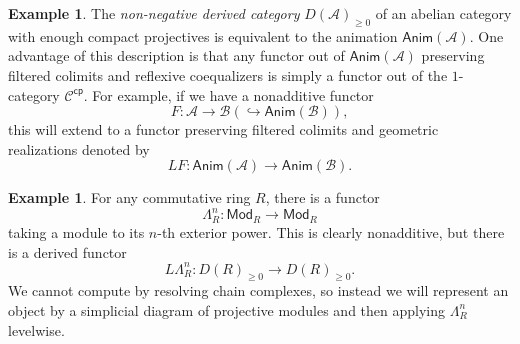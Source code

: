 \documentclass[10pt]{amsart}
\theoremstyle{definition}
\newtheorem{exm}[thm]{Example}
\theoremstyle{remark}
\theoremstyle{plain}
\theoremstyle{definition}
\theoremstyle{remark}
\newcommand{\mc}[1]{\mathcal{#1}}
\newcommand{\ms}[1]{\mathsf{#1}}
\newcommand{\1}{\mathbf{1}}
\newcommand{\2}{\mathbf{2}}
\newcommand{\3}{\mathbf{3}}
\begin{document}
\begin{exm}
    The \textit{non-negative derived category} $D(\mc{A})_{\geq 0}$ of an abelian category with enough compact projectives is equivalent to the animation $\ms{Anim}(\mc{A})$. One advantage of this description is that any functor out of $\ms{Anim}(\mc{A})$ preserving filtered colimits and reflexive coequalizers is simply a functor out of the $1$-category $\mc{C}^{\ms{cp}}$. For example, if we have a nonadditive functor
    \[ F \colon \mc{A} \to \mc{B} (\hookrightarrow \ms{Anim}(\mc{B})), \]
    this will extend to a functor preserving filtered colimits and geometric realizations denoted by
    \[ LF \colon \ms{Anim}(\mc{A}) \to \ms{Anim}(\mc{B}). \]
\end{exm}

\begin{exm}
    For any commutative ring $R$, there is a functor
    \[ \Lambda_R^{n} \colon \ms{Mod}_R \to \ms{Mod}_R \]
    taking a module to its $n$-th exterior power. This is clearly nonadditive, but there is a derived functor
    \[ L \Lambda_R^n \colon D(R)_{\geq 0} \to D(R)_{\geq 0}. \]
    We cannot compute by resolving chain complexes, so instead we will represent an object by a simplicial diagram of projective modules and then applying $\Lambda_R^n$ levelwise.


\end{exm}
\end{document}
